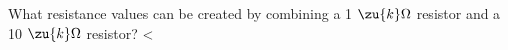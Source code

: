What resistance values can be created by combining a
        1 $\zu{k}\Omega$ resistor and a 10 $\zu{k}\Omega$ resistor?
        <%
